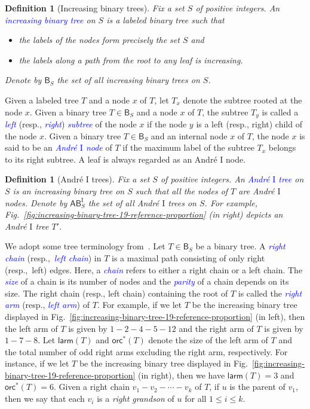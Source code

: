 \documentclass[12pt]{article}
\def\blue{\textcolor{blue}}
\def\blue{\textcolor{blue}}
\numberwithin{equation}{section}
\def\blue{\textcolor{blue}}
\def\blue{\textcolor{blue}}
\theoremstyle{plain}
\newtheorem{definition}[theorem]{Definition}
\def\orc{\mathsf{orc}}
\def\larm{\mathsf{larm}}
\def\B{\mathsf{B}}
\def\AB{\mathsf{AB}}
\begin{document}
 
 \begin{definition}[Increasing binary trees]
 	Fix a  set $S$ of positive integers.   An  \blue{  increasing binary  tree} on $S$ is a labeled  binary tree   such that
 	\begin{itemize} 
 		\item  the labels of the nodes form precisely the set $S$ and
 		\item  the labels along a path from the root to any leaf is  increasing.
 	\end{itemize}
 	Denote by $\B_S$ the set of all   increasing binary trees on $S$. 
 \end{definition}
 Given a labeled tree $T$ and a node $x$ of $T$,  let $T_{x}$ denote the subtree rooted at the node $x$.  
 Given  a binary tree $T\in \B_S$ and a node $x$ of $T$,  the subtree $T_{y}$ is called a \blue{\em left} (resp., \blue{\em right})  \blue{\em subtree} of the node $x$  if the node $y$ is a left (resp., right) child of the node $x$. 
 Given a binary tree $T\in \B_S$ and an internal node $x$ of $T$,  the node    $x$ is said  to be  an  \blue{\em Andr\'e  $\mathrm{I}$ node}  of $T$ if the maximum  label of the subtree $T_x$  belongs to its right subtree.  A leaf  is always regarded as an  Andr\'e $\mathrm{I}$ node.  
 \begin{definition}[Andr\'e $\mathrm{I}$ trees]
 	Fix a  set $S$ of positive integers.   An  \blue{  Andr\'e $\mathrm{I}$ tree} on $S$ is an increasing binary tree on $S$   such that  all the nodes of $T$ are Andr\'e $\mathrm{I}$ nodes.
 	Denote by $\AB^{\mathrm{I}}_S$ the set of all   Andr\'e $\mathrm{I}$ trees on $S$.    For example,  Fig.~\ref{fig:increasing-binary-tree-19-reference-proportion}  (in right) depicts  an Andr\'e  $\mathrm{I}$ tree $T'$.
 \end{definition}
 
  
 We adopt some tree terminology from~\cite{Lin2,Lin3}. Let $T\in \B_S$ be a binary tree.  A \blue{\em right chain} (resp.,~\blue{\em left chain}) in $T$ is a maximal path consisting of only right (resp.,~left) edges. Here, a \blue{\em chain} refers to either a right chain or a left chain.
 The \blue{\em size} of a chain is  its  number of nodes and the \blue{\em parity} of a chain depends on its  size.     
  The right chain (resp., left chain) containing the root of $T$ is called  the \blue{\em right arm}  (resp., \blue{\em left arm}) of $T$.   For example,  if we let $T$ be the increasing binary tree displayed in Fig.~\ref{fig:increasing-binary-tree-19-reference-proportion} (in left), then the left arm of $T$ is given by $1-2-4-5-12$ and the right arm of $T$ is given by $1-7-8$.    Let $\larm(T)$ and  $\orc^*(T)$ denote the size of the left arm of $T$ and the total number of odd right arms excluding the right arm, respectively.  For instance, if we let $T$ be the increasing binary tree displayed in Fig.~\ref{fig:increasing-binary-tree-19-reference-proportion} (in right),  then we have $\larm(T)=3$ and $\orc^*(T)=6$. 
 Given a right chain $v_1-v_2-\cdots-v_k$ of $T$, if $u$ is the parent of $v_1$, then we say that each $v_i$ is a {\em right grandson}  of $u$ for all $1\leq i\leq k$. 
 
\end{document}
